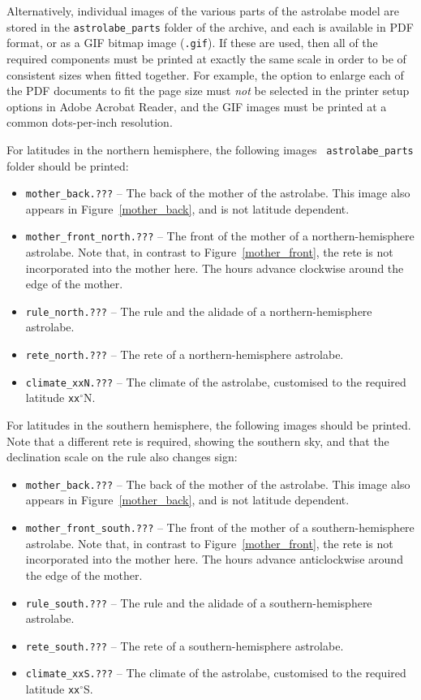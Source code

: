 \documentclass[a4paper,onecolumn,10pt]{article}
\begin{document}
Alternatively, individual images of the various parts of the astrolabe model
are stored in the {\tt astrolabe\_parts} folder of the archive, and each is
available in PDF format, or as a GIF bitmap image ({\tt .gif}).  If these are
used, then all of the required components must be printed at exactly the same
scale in order to be of consistent sizes when fitted together. For example, the
option to enlarge each of the PDF documents to fit the page size must {\it not}
be selected in the printer setup options in Adobe Acrobat Reader, and the GIF
images must be printed at a common dots-per-inch resolution.

For latitudes in the northern hemisphere, the following images {\tt
astrolabe\_parts} folder should be printed:
\begin{itemize}
\item {\tt mother\_back.???} -- The back of the mother of the astrolabe. This image also appears in Figure~\ref{mother_back}, and is not latitude dependent.
\item {\tt mother\_front\_north.???} -- The front of the mother of a northern-hemi\-sp\-here astrolabe. Note that, in contrast to Figure~\ref{mother_front}, the rete is not incorporated into the mother here. The hours advance clockwise around the edge of the mother.
\item {\tt rule\_north.???} -- The rule and the alidade of a northern-hemisphere astrolabe.
\item {\tt rete\_north.???} -- The rete of a northern-hemisphere astrolabe.
\item{\tt climate\_xxN.???} -- The climate of the astrolabe, customised to the required latitude {\tt xx}$^\circ$N.
\end{itemize}

For latitudes in the southern hemisphere, the following images should be
printed. Note that a different rete is required, showing the southern sky,
and that the declination scale on the rule also changes sign:
\begin{itemize}
\item {\tt mother\_back.???} -- The back of the mother of the astrolabe. This image also appears in Figure~\ref{mother_back}, and is not latitude dependent.
\item {\tt mother\_front\_south.???} -- The front of the mother of a southern-hemi\-sp\-here astrolabe. Note that, in contrast to Figure~\ref{mother_front}, the rete is not incorporated into the mother here. The hours advance anticlockwise around the edge of the mother.
\item {\tt rule\_south.???} -- The rule and the alidade of a southern-hemisphere astrolabe.
\item {\tt rete\_south.???} -- The rete of a southern-hemisphere astrolabe.
\item{\tt climate\_xxS.???} -- The climate of the astrolabe, customised to the required latitude {\tt xx}$^\circ$S.
\end{itemize}
\end{document}
